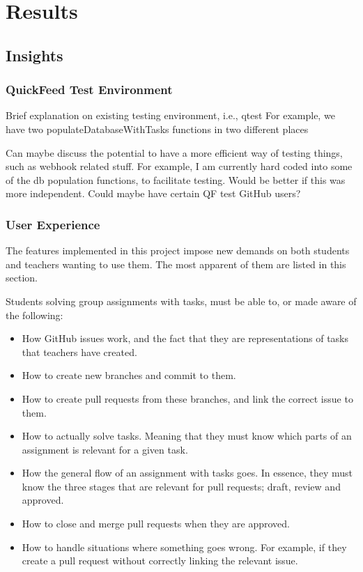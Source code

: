 
\chapter{Results}

\section{Insights}


\subsection{QuickFeed Test Environment}

Brief explanation on existing testing environment, i.e., qtest
For example, we have two populateDatabaseWithTasks functions in two different places

Can maybe discuss the potential to have a more efficient way of testing things, such as webhook related stuff.
For example, I am currently hard coded into some of the db population functions, to facilitate testing.
Would be better if this was more independent. 
Could maybe have certain QF test GitHub users?

\subsection{User Experience}

The features implemented in this project impose new demands on both students and teachers wanting to use them.
The most apparent of them are listed in this section.

Students solving group assignments with tasks, must be able to, or made aware of the following:
\begin{itemize}
    \item How GitHub issues work, and the fact that they are representations of tasks that teachers have created.
    \item How to create new branches and commit to them.
    \item How to create pull requests from these branches, and link the correct issue to them.
    \item How to actually solve tasks.
    Meaning that they must know which parts of an assignment is relevant for a given task.
    \item How the general flow of an assignment with tasks goes.
    In essence, they must know the three stages that are relevant for pull requests; draft, review and approved.
    \item How to close and merge pull requests when they are approved.
    \item How to handle situations where something goes wrong.
    For example, if they create a pull request without correctly linking the relevant issue.
\end{itemize}

